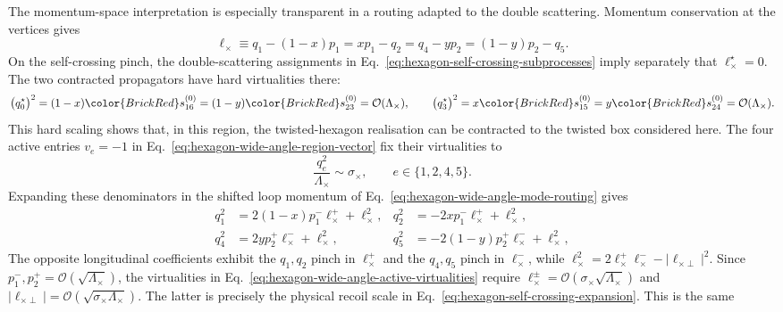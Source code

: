 \documentclass[a4paper,11pt]{article}
\newcommand{\NegInv}[1]{{\color{BrickRed}#1}}
\begin{document}
The momentum-space interpretation is especially transparent in a routing
adapted to the double scattering.  Momentum conservation at the vertices gives
\begin{equation}
 \ell_\times
 \equiv q_1-(1-x)p_1
 =xp_1-q_2
 =q_4-yp_2
 =(1-y)p_2-q_5 .
 \label{eq:hexagon-wide-angle-mode-routing}
\end{equation}
On the self-crossing pinch, the double-scattering assignments in
Eq.~\eqref{eq:hexagon-self-crossing-subprocesses} imply separately that
\(\ell_\times^\star=0\).  The two contracted propagators have hard
virtualities there:
\begin{equation}
 \bigl(q_0^\star\bigr)^2
 =(1-x)\NegInv{s_{16}^{(0)}}
 =(1-y)\NegInv{s_{23}^{(0)}}
 =\mathcal O(\Lambda_\times),
 \qquad
 \bigl(q_3^\star\bigr)^2
 =x\NegInv{s_{15}^{(0)}}
 =y\NegInv{s_{24}^{(0)}}
 =\mathcal O(\Lambda_\times).
 \label{eq:hexagon-wide-angle-hard-contracted-virtualities}
\end{equation}
This hard scaling shows that, in this region, the twisted-hexagon realisation
can be contracted to the twisted box considered here.
The four active entries \(v_e=-1\) in
Eq.~\eqref{eq:hexagon-wide-angle-region-vector} fix their virtualities to
\begin{equation}
 \frac{q_e^2}{\Lambda_\times}\sim\sigma_\times,
 \qquad e\in\{1,2,4,5\}.
 \label{eq:hexagon-wide-angle-active-virtualities}
\end{equation}
Expanding these denominators in the shifted loop momentum of
Eq.~\eqref{eq:hexagon-wide-angle-mode-routing} gives
\begin{align}
 q_1^2&= 2(1-x)p_1^-\ell_\times^+
          +\ell_\times^2,&
 q_2^2&=-2x p_1^-\ell_\times^+
          +\ell_\times^2,\nonumber\\
 q_4^2&= 2y p_2^+\ell_\times^-
          +\ell_\times^2,&
 q_5^2&=-2(1-y)p_2^+\ell_\times^-
          +\ell_\times^2,
 \label{eq:hexagon-wide-angle-linearised-denominators}
\end{align}
The opposite longitudinal coefficients exhibit the \(q_1,q_2\) pinch in
\(\ell_\times^+\) and the \(q_4,q_5\) pinch in \(\ell_\times^-\), while
\(\ell_\times^2=2\ell_\times^+\ell_\times^-
-|\ell_{\times\perp}|^2\).  Since
\(p_1^-,p_2^+=\mathcal O(\sqrt{\Lambda_\times})\), the virtualities in
Eq.~\eqref{eq:hexagon-wide-angle-active-virtualities} require
\(\ell_\times^\pm=\mathcal O(\sigma_\times\sqrt{\Lambda_\times})\) and
\(|\ell_{\times\perp}|=\mathcal O(\sqrt{\sigma_\times\Lambda_\times})\).
The latter is precisely the physical recoil scale in
Eq.~\eqref{eq:hexagon-self-crossing-expansion}.  This is the same
\end{document}
